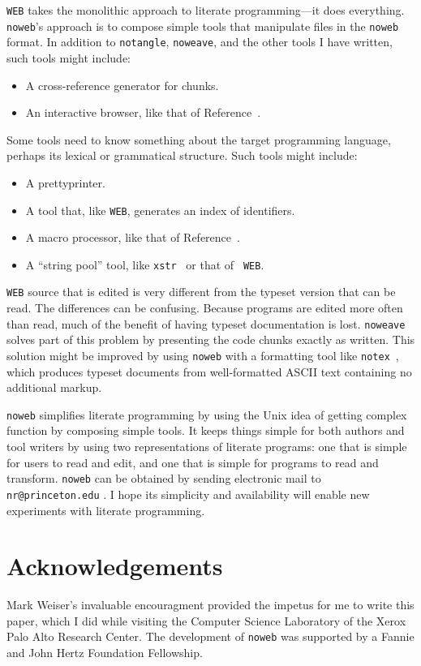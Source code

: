 {\tt WEB} takes the monolithic approach to literate programming---it
does everything.
{\tt noweb}'s approach is to compose
simple tools that manipulate files in the {\tt noweb} format. 
In addition to {\tt notangle}, {\tt noweave}, and the other tools I
have written,
such tools might include:
\begin{itemize}
\item
A cross-reference generator for chunks.
\item
An interactive browser, like that of
Reference~\cite{brown:interactive}. 
\end{itemize}
Some tools need to know something about the target programming
language, perhaps its lexical or grammatical structure.
Such tools might include:
\begin{itemize}
\item
A prettyprinter.
\item
A tool that, like {\tt WEB}, generates an index of identifiers.
\item
A macro processor, like that of Reference~\cite{kernighan:m4}.
\item
A ``string pool'' tool, like \verb+xstr+~\cite{unix:xstr} or that of {\tt
WEB}. 
\end{itemize}


{\tt WEB} source that is edited is very different from the typeset
version that can be read.
The differences can be confusing.
Because programs are edited more often than read, much of the benefit
of having typeset documentation is lost.
\verb+noweave+ solves part of this problem by presenting the code
chunks exactly as written.
This solution might be improved by using \verb+noweb+ with a
formatting tool like \verb+notex+~\cite{lipton:notex}, which produces
typeset documents from well-formatted ASCII text containing no
additional markup. 

{\tt noweb} simplifies literate programming by using the Unix idea of
getting complex function by composing simple tools.
It keeps things simple for both authors and tool writers by using two
representations of literate programs: one that is simple for users to
read and edit, and one that 
is simple for programs to read and transform.
\verb+noweb+ can be obtained by 
sending electronic mail to \verb+nr@princeton.edu+%
.
I hope its simplicity and availability will enable new
experiments with literate programming.

\section{Acknowledgements}
Mark Weiser's invaluable encouragment provided the impetus for me to
write this paper, which I did while visiting the Computer
Science Laboratory of the Xerox Palo Alto Research Center.
The development of {\tt noweb} was supported by a Fannie and John Hertz
Foundation Fellowship.

